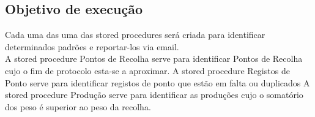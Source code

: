 \subsection{Objetivo de execução}
Cada uma das uma das stored procedures será criada para identificar determinados padrões e reportar-los via email.\\
A stored procedure Pontos de Recolha serve para identificar Pontos de Recolha cujo o fim de protocolo esta-se a aproximar.
A stored procedure Registos de Ponto serve para identificar registos de ponto que estão em falta ou duplicados
A stored procedure Produção serve para identificar as produções cujo o somatório dos peso é superior ao peso da recolha. 